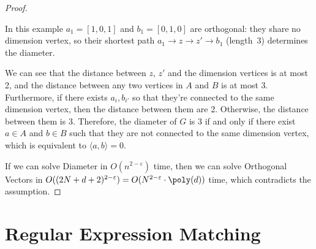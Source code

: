 \begin{proof}
\begin{center}
	\end{center}
	In this example $a_1=[1,0,1]$ and $b_1=[0,1,0]$ are orthogonal: they share no dimension vertex, so their shortest path $a_1\!\to\!z\!\to\!z'\!\to\!b_1$ (length~3) determines the diameter.

	We can see that the distance between $z$, $z'$ and the dimension vertices is at most 2, and the distance between any two vertices in $A$ and $B$ is at most 3. Furthermore, if there exists $a_i, b_{i'}$ so that they're connected to the same dimension vertex, then the distance between them are 2. Otherwise, the distance between them is 3. Therefore, the diameter of $G$ is 3 if and only if there exist $a \in A$ and $b \in B$ such that they are not connected to the same dimension vertex, which is equivalent to $\langle a, b \rangle = 0$.

	If we can solve Diameter in $O(n^{2-\varepsilon})$ time, then we can solve Orthogonal Vectors in $O((2N+d+2)^{2-\varepsilon}) = O(N^{2-\varepsilon} \cdot \poly(d))$ time, which contradicts the assumption.
\end{proof}

\section{Regular Expression Matching}

